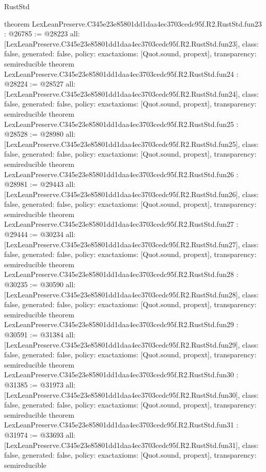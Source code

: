 \begin{lexlean}{RustStd}
\begin{coremodule}
{}
theorem LexLeanPreserve.C345e23e85801dd1daa4ec3703cedc95f.R2.RustStd.fun23 : @26785 := @28223 {
  all: [LexLeanPreserve.C345e23e85801dd1daa4ec3703cedc95f.R2.RustStd.fun23],
  class: false,
  generated: false,
  policy: exact{axioms: [Quot.sound, propext]},
  transparency: semireducible
}
theorem LexLeanPreserve.C345e23e85801dd1daa4ec3703cedc95f.R2.RustStd.fun24 : @28224 := @28527 {
  all: [LexLeanPreserve.C345e23e85801dd1daa4ec3703cedc95f.R2.RustStd.fun24],
  class: false,
  generated: false,
  policy: exact{axioms: [Quot.sound, propext]},
  transparency: semireducible
}
theorem LexLeanPreserve.C345e23e85801dd1daa4ec3703cedc95f.R2.RustStd.fun25 : @28528 := @28980 {
  all: [LexLeanPreserve.C345e23e85801dd1daa4ec3703cedc95f.R2.RustStd.fun25],
  class: false,
  generated: false,
  policy: exact{axioms: [Quot.sound, propext]},
  transparency: semireducible
}
theorem LexLeanPreserve.C345e23e85801dd1daa4ec3703cedc95f.R2.RustStd.fun26 : @28981 := @29443 {
  all: [LexLeanPreserve.C345e23e85801dd1daa4ec3703cedc95f.R2.RustStd.fun26],
  class: false,
  generated: false,
  policy: exact{axioms: [Quot.sound, propext]},
  transparency: semireducible
}
theorem LexLeanPreserve.C345e23e85801dd1daa4ec3703cedc95f.R2.RustStd.fun27 : @29444 := @30234 {
  all: [LexLeanPreserve.C345e23e85801dd1daa4ec3703cedc95f.R2.RustStd.fun27],
  class: false,
  generated: false,
  policy: exact{axioms: [Quot.sound, propext]},
  transparency: semireducible
}
theorem LexLeanPreserve.C345e23e85801dd1daa4ec3703cedc95f.R2.RustStd.fun28 : @30235 := @30590 {
  all: [LexLeanPreserve.C345e23e85801dd1daa4ec3703cedc95f.R2.RustStd.fun28],
  class: false,
  generated: false,
  policy: exact{axioms: [Quot.sound, propext]},
  transparency: semireducible
}
theorem LexLeanPreserve.C345e23e85801dd1daa4ec3703cedc95f.R2.RustStd.fun29 : @30591 := @31384 {
  all: [LexLeanPreserve.C345e23e85801dd1daa4ec3703cedc95f.R2.RustStd.fun29],
  class: false,
  generated: false,
  policy: exact{axioms: [Quot.sound, propext]},
  transparency: semireducible
}
theorem LexLeanPreserve.C345e23e85801dd1daa4ec3703cedc95f.R2.RustStd.fun30 : @31385 := @31973 {
  all: [LexLeanPreserve.C345e23e85801dd1daa4ec3703cedc95f.R2.RustStd.fun30],
  class: false,
  generated: false,
  policy: exact{axioms: [Quot.sound, propext]},
  transparency: semireducible
}
theorem LexLeanPreserve.C345e23e85801dd1daa4ec3703cedc95f.R2.RustStd.fun31 : @31974 := @33693 {
  all: [LexLeanPreserve.C345e23e85801dd1daa4ec3703cedc95f.R2.RustStd.fun31],
  class: false,
  generated: false,
  policy: exact{axioms: [Quot.sound, propext]},
  transparency: semireducible
}
\end{coremodule}
\end{lexlean}
